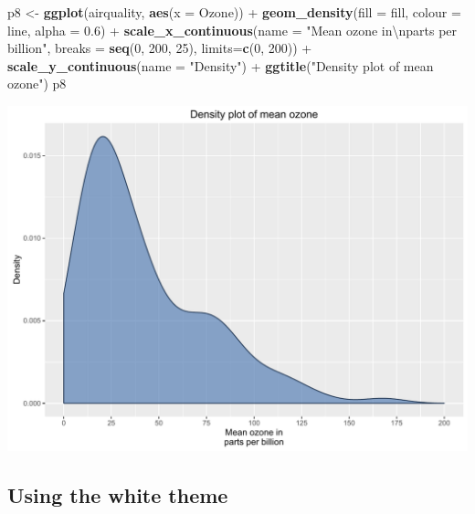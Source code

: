 \documentclass[]{article}
\newenvironment{Shaded}{\begin{snugshade}}{\end{snugshade}}
\newcommand{\KeywordTok}[1]{\textcolor[rgb]{0.13,0.29,0.53}{\textbf{{#1}}}}
\newcommand{\DataTypeTok}[1]{\textcolor[rgb]{0.13,0.29,0.53}{{#1}}}
\newcommand{\DecValTok}[1]{\textcolor[rgb]{0.00,0.00,0.81}{{#1}}}
\newcommand{\FloatTok}[1]{\textcolor[rgb]{0.00,0.00,0.81}{{#1}}}
\newcommand{\CharTok}[1]{\textcolor[rgb]{0.31,0.60,0.02}{{#1}}}
\newcommand{\StringTok}[1]{\textcolor[rgb]{0.31,0.60,0.02}{{#1}}}
\newcommand{\NormalTok}[1]{{#1}}
\begin{document}
\begin{Shaded}
\begin{Highlighting}[]
\NormalTok{p8 <-}\StringTok{ }\KeywordTok{ggplot}\NormalTok{(airquality, }\KeywordTok{aes}\NormalTok{(}\DataTypeTok{x =} \NormalTok{Ozone)) +}\StringTok{ }
\StringTok{      }\KeywordTok{geom_density}\NormalTok{(}\DataTypeTok{fill =} \NormalTok{fill, }\DataTypeTok{colour =} \NormalTok{line,}
                   \DataTypeTok{alpha =} \FloatTok{0.6}\NormalTok{) +}
\StringTok{      }\KeywordTok{scale_x_continuous}\NormalTok{(}\DataTypeTok{name =} \StringTok{"Mean ozone in}\CharTok{\textbackslash{}n}\StringTok{parts per billion"}\NormalTok{,}
                         \DataTypeTok{breaks =} \KeywordTok{seq}\NormalTok{(}\DecValTok{0}\NormalTok{, }\DecValTok{200}\NormalTok{, }\DecValTok{25}\NormalTok{),}
                         \DataTypeTok{limits=}\KeywordTok{c}\NormalTok{(}\DecValTok{0}\NormalTok{, }\DecValTok{200}\NormalTok{)) +}
\StringTok{      }\KeywordTok{scale_y_continuous}\NormalTok{(}\DataTypeTok{name =} \StringTok{"Density"}\NormalTok{) +}
\StringTok{      }\KeywordTok{ggtitle}\NormalTok{(}\StringTok{"Density plot of mean ozone"}\NormalTok{)}
\NormalTok{p8}
\end{Highlighting}
\end{Shaded}

\begin{center}\includegraphics{0_all_posts_pdf/density_8-1} \end{center}

\subsection{Using the white theme}\label{using-the-white-theme-7}
\end{document}
